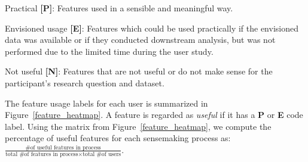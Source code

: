  \begin{denselist}
     \item Practical \textbf{[P]}: Features used in a sensible and meaningful way.
     \item Envisioned usage \textbf{[E]}: Features which could be used practically if the envisioned data was available or if they conducted downstream analysis, but was not performed due to the limited time during the user study.
     \item Not useful \textbf{[N]}: Features that are not useful or do not make sense for the participant's research question and dataset.
 \end{denselist}
 The feature usage labels for each user is summarized in Figure~\ref{feature_heatmap}. A feature is regarded as \emph{useful} if it has a \textbf{P} or \textbf{E} code label. Using the matrix from Figure~\ref{feature_heatmap}, we compute the percentage of useful features for each sensemaking process as: $\frac{\textrm{\# of useful features in process}}{\textrm{total \# of features in process} \times \textrm{total \# of users}}$.
